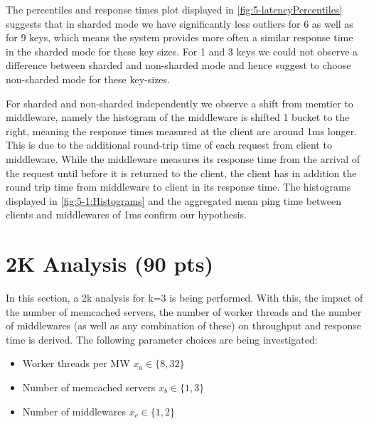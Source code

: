 \documentclass[11pt,a4paper]{article}
\begin{document}
The percentiles and response times plot displayed in \autoref{fig:5-latencyPercentiles} suggests that in sharded mode we have significantly less outliers for 6 as well as for 9 keys, which means the system provides more often a similar response time in the sharded mode for these key sizes. For 1 and 3 keys we could not observe a difference between sharded and non-sharded mode and hence suggest to choose non-sharded mode for these key-sizes.

For sharded and non-sharded independently we observe a shift from memtier to middleware, namely the histogram of the middleware is shifted 1 bucket to the right, meaning the response times measured at the client are around 1ms longer. This is due to the additional round-trip time of each request from client to middleware. While the middleware measures its response time from the arrival of the request until before it is returned to the client, the client has in addition the round trip time from middleware to client in its response time. The histograms displayed in \autoref{fig:5-1:Histograms} and the aggregated mean ping time between clients and middlewares of 1ms confirm our hypothesis.

\section{2K Analysis (90 pts)}

In this section, a 2k analysis for k=3 is being performed. With this, the impact of the number of memcached servers, the number of worker threads and the number of middlewares (as well as any combination of these) on throughput and response time is derived. The following parameter choices are being investigated:

\begin{itemize}
		
	\item Worker threads per MW $x_a \in \{8, 32\}$
	\item Number of memcached servers $x_b \in \{1, 3\}$
	\item Number of middlewares $x_c \in \{1,2\}$
	      	      
\end{itemize}
\end{document}
